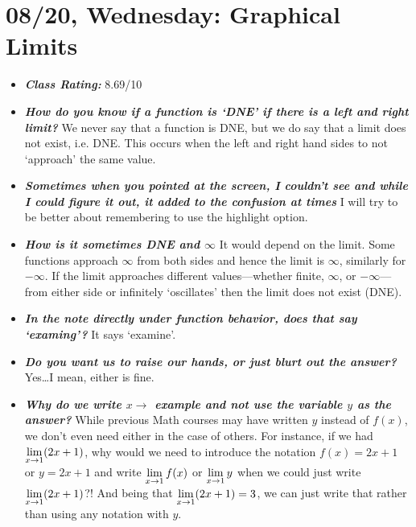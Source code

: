 \documentclass[11pt,letterpaper]{article}
\begin{document}
\newpage
\section*{08/20, Wednesday: Graphical Limits\label{08-20}}

\begin{itemize}
\item {\bfseries\itshape Class Rating:} 8.69/10

\item {\bfseries\itshape How do you know if a function is `DNE' if there is a left and right limit?} We never say that a function is DNE, but we do say that a limit does not exist, i.e. DNE. This occurs when the left and right hand sides to not `approach' the same value. 

\item {\bfseries\itshape Sometimes when you pointed at the screen, I couldn't see and while I could figure it out, it added to the confusion at times} I will try to be better about remembering to use the highlight option. 

\item {\bfseries\itshape How is it sometimes DNE and $\infty$} It would depend on the limit. Some functions approach $\infty$ from both sides and hence the limit is $\infty$, similarly for $-\infty$. If the limit approaches different values---whether finite, $\infty$, or $-\infty$---from either side or infinitely `oscillates' then the limit does not exist (DNE). 

\item {\bfseries\itshape In the note directly under function behavior, does that say `examing'?} It says `examine'. 

\item {\bfseries\itshape Do you want us to raise our hands, or just blurt out the answer?} Yes\dots I mean, either is fine. 

\item {\bfseries\itshape Why do we write $x \to$ example and not use the variable $y$ as the answer?} While previous Math courses may have written $y$ instead of $f(x)$, we don't even need either in the case of others. For instance, if we had $\displaystyle\lim_{x \to 1} (2x + 1)$, why would we need to introduce the notation $f(x)= 2x + 1$ or $y= 2x + 1$ and write $\displaystyle\lim_{x \to 1} f(x)$ or $\displaystyle\lim_{x \to 1} y$ when we could just write $\displaystyle\lim_{x \to 1} (2x + 1)$?! And being that $\displaystyle\lim_{x \to 1} (2x + 1)= 3$, we can just write that rather than using any notation with $y$. 


\end{itemize}
\end{document}
